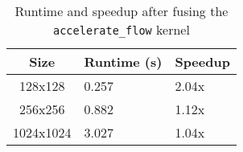 \begin{table}[ht]
\vspace{-5mm}
\centering
\caption{Runtime and speedup after fusing the \texttt{accelerate\_flow} kernel}
\vspace{1mm}
\begin{tabular}{|c||p{5.8em}|p{4.8em}|}
    \hline
    Size & Runtime (s) & Speedup \\
    \hline
    128x128 & 0.257 & 2.04x \\
    \hline
    256x256 & 0.882 & 1.12x \\
    \hline
    1024x1024 & 3.027 & 1.04x \\
    \hline
\end{tabular}
\label{table:fusing-accel-flow}
\vspace{-7mm}
\end{table}